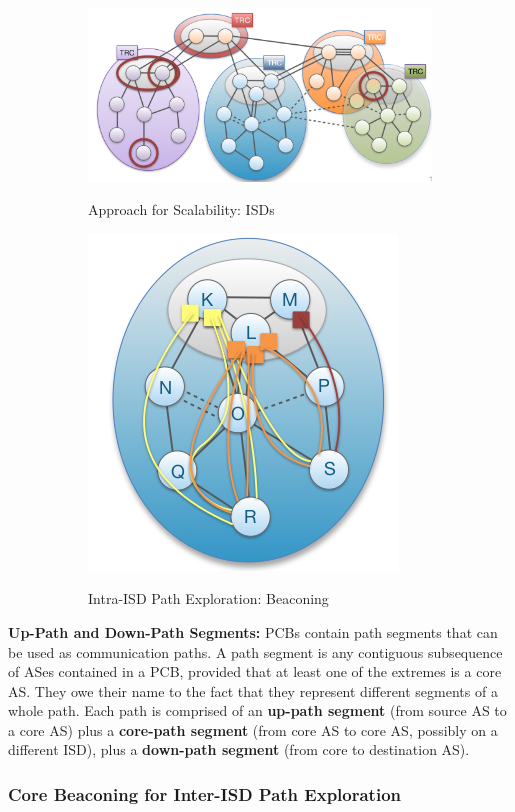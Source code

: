\documentclass[11pt,oneside,a4paper]{article}
\begin{document}
\begin{figure}[hb]
	\centering
	\begin{subfigure}[t]{.5\textwidth}
		\centering
		\includegraphics[width=0.7\linewidth]{figures/scion_isd}
		\label{fig:scion_isd}
		\caption{Approach for Scalability: ISDs}
	\end{subfigure}%
	\begin{subfigure}[t]{.5\textwidth}
		\centering
		\includegraphics[width=0.4\linewidth]{figures/scion_beaconing}
		\label{fig:scion_beaconing}
		\caption{Intra-ISD Path Exploration: Beaconing}
	\end{subfigure}
	\caption{}
\end{figure}

\newpage

\noindent \textbf{Up-Path and Down-Path Segments:} PCBs contain path segments that
can be used as communication paths. A path segment is any contiguous subsequence of ASes contained in a PCB, provided that at least one of the extremes is a core AS. They owe their name to the fact that they represent different segments of a whole path. Each path is comprised of an \textbf{up-path segment} (from source AS to a core AS) plus a \textbf{core-path segment} (from core AS to core AS, possibly on a different ISD), plus a \textbf{down-path segment} (from core to destination AS).\\

\subsubsection{Core Beaconing for Inter-ISD Path Exploration}
\end{document}
